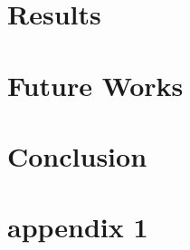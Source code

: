 \documentclass[12pt, twoside, openright]{report}
\begin{document}
	\chapter{Results}
	
	
	\chapter{Future Works}
	
	
	\chapter{Conclusion}
	
	
	\appendix
	\chapter{appendix 1}
	
	
	{}
	
\end{document}
